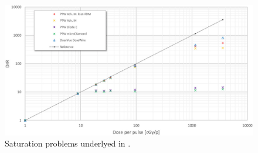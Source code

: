             \begin{figure}
                \centering
                \includegraphics[width=.95\linewidth]{figures/pixel_detectors_usage/saturation1.png}
                \caption{Saturation problems underlyed in \cite{FLASH_dosimeters}. }
                \label{fig:saturation_dosimeters}
            \end{figure}            
            
